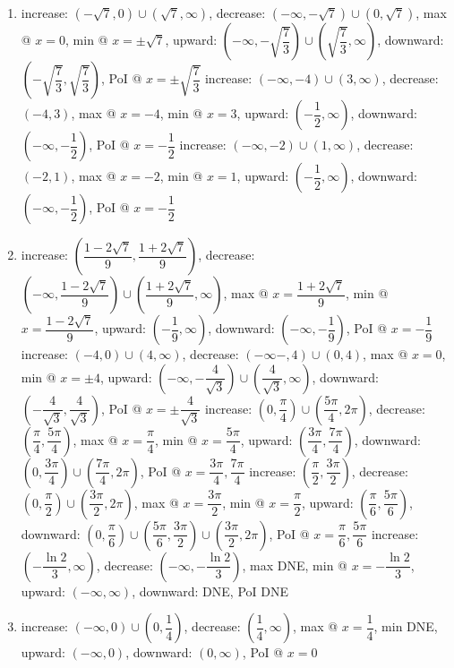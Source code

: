 \documentclass{book}
\begin{document}
\begin{appendices}
\begin{enumerate}[!HW!]
\item  increase: $(-\sqrt{7}, 0) \cup (\sqrt{7}, \infty)$, decrease: $(-\infty, -\sqrt{7}) \cup (0, \sqrt{7})$, max @ $x=0$,  min @ $x=\pm\sqrt{7}$, upward: $\left(-\infty,-\sqrt{\dfrac{7}{3}}\right)\cup\left(\sqrt{\dfrac{7}{3}}, \infty\right)$, downward: $\left(-\sqrt{\dfrac{7}{3}},\sqrt{\dfrac{7}{3}}\right)$, PoI @ $x=\pm\sqrt{\dfrac{7}{3}}$
\itemspade increase: $(-\infty,-4)\cup(3,\infty)$,  decrease: $(-4,3)$, max @ $x=-4$, min @ $x=3$, upward: $\left(-\dfrac{1}{2},\infty\right)$, downward: $\left(-\infty,-\dfrac{1}{2}\right)$, PoI @ $x=-\dfrac{1}{2}$
\itemspade increase: $(-\infty,-2)\cup(1,\infty)$,  decrease: $(-2,1)$, max @ $x=-2$, min @ $x=1$, upward: $\left(-\dfrac{1}{2},\infty\right)$, downward: $\left(-\infty,-\dfrac{1}{2}\right)$, PoI @ $x=-\dfrac{1}{2}$
\item increase: $\left(\dfrac{1-2\sqrt{7}}{9},\dfrac{1+2\sqrt{7}}{9}\right)$, decrease: $\left(-\infty,\dfrac{1-2\sqrt{7}}{9}\right)\cup\left(\dfrac{1+2\sqrt{7}}{9},\infty\right)$, max @ $x=\dfrac{1+2\sqrt{7}}{9}$, min @ $x=\dfrac{1-2\sqrt{7}}{9}$, upward: $\left(-\dfrac{1}{9},\infty\right)$, downward: $\left(-\infty,-\dfrac{1}{9}\right)$, PoI @ $x=-\dfrac{1}{9}$
\itemspade increase: $(-4,0)\cup(4,\infty)$,  decrease: $(-\infty-,4)\cup(0,4)$, max @ $x=0$, min @ $x=\pm4$, upward: $\left(-\infty,-\dfrac{4}{\sqrt{3}}\right)\cup\left(\dfrac{4}{\sqrt{3}},\infty\right)$, downward: $\left(-\dfrac{4}{\sqrt{3}},\dfrac{4}{\sqrt{3}}\right)$, PoI @ $x=\pm\dfrac{4}{\sqrt{3}}$
\itemspade increase: $\left(0,\dfrac{\pi}{4}\right)\cup\left(\dfrac{5\pi}{4},2\pi\right)$,  decrease: $\left(\dfrac{\pi}{4},\dfrac{5\pi}{4}\right)$, max @ $x=\dfrac{\pi}{4}$, min @ $x=\dfrac{5\pi}{4}$, upward: $\left(\dfrac{3\pi}{4},\dfrac{7\pi}{4}\right)$, downward: $\left(0,\dfrac{3\pi}{4}\right)\cup\left(\dfrac{7\pi}{4},2\pi\right)$, PoI @ $x=\dfrac{3\pi}{4}, \dfrac{7\pi}{4}$
\itemspade increase: $\left(\dfrac{\pi}{2},\dfrac{3\pi}{2}\right)$,  decrease: $\left(0, \dfrac{\pi}{2}\right)\cup\left(\dfrac{3\pi}{2},2\pi\right)$, max @ $x=\dfrac{3\pi}{2}$, min @ $x=\dfrac{\pi}{2}$, upward: $\left(\dfrac{\pi}{6},\dfrac{5\pi}{6}\right)$, downward: $\left(0,\dfrac{\pi}{6}\right)\cup\left(\dfrac{5\pi}{6},\dfrac{3\pi}{2}\right)\cup\left(\dfrac{3\pi}{2},2\pi\right)$, PoI @ $x=\dfrac{\pi}{6}, \dfrac{5\pi}{6}$
\itemspade increase: $\left(-\dfrac{\ln 2}{3},\infty\right)$,  decrease: $\left(-\infty, -\dfrac{\ln 2}{3}\right)$, max  DNE, min @ $x=-\dfrac{\ln 2}{3}$, upward: $(-\infty,\infty)$, downward: DNE, PoI  DNE
\item increase: $(-\infty, 0)\cup\left(0,\dfrac{1}{4}\right)$, decrease: $\left(\dfrac{1}{4}, \infty\right)$, max @ $x=\dfrac{1}{4}$,  min  DNE, upward: $(-\infty,0)$, downward: $(0,\infty)$, PoI @ $x=0$
\end{enumerate}



\end{appendices}
\end{document}
